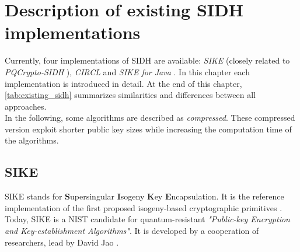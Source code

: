 \chapter{Description of existing \gls{SIDH} implementations}\label{chapter:existing_sidh}
Currently, four implementations of \gls{SIDH} are available: \textit{\gls{SIKE}} \parencite{sike2020spec} (closely related to \textit{\gls{PQCrypto-SIDH}} \parencite{microsoft2020sidh}), \textit{\gls{CIRCL}} \parencite{circl2020github} and \textit{SIKE for Java} \parencite{SikeForJava2020github}. In this chapter each implementation is introduced in detail. At the end of this chapter, \autoref{tab:existing_sidh} summarizes similarities and differences between all approaches.
\\
In the following, some algorithms are described as \textit{compressed}. These compressed version exploit shorter public key sizes while increasing the computation time of the algorithms.

\section{\gls{SIKE}}
\gls{SIKE} stands for \textbf{S}upersingular \textbf{I}sogeny \textbf{K}ey \textbf{E}ncapsulation. It is the reference implementation of the first proposed isogeny-based cryptographic primitives \parencite{jao2011towards}. Today, \gls{SIKE} is a \gls{NIST} candidate for quantum-resistant \textit{"Public-key Encryption and Key-establishment Algorithms"}. It is developed by a cooperation of researchers, lead by David Jao \parencite{sike2020spec}.

